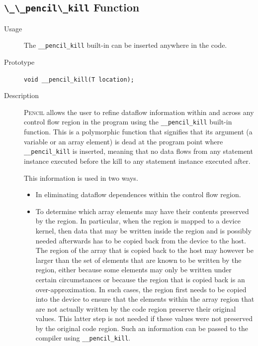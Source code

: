 \documentclass{carp}
\newcommand\pencil{\textsc{Pencil}\xspace}
\begin{document}
\subsection{\lstinline!\_\_pencil\_kill! Function}
\begin{description}
\item [Usage] The \lstinline!__pencil_kill! built-in can be
  inserted anywhere in the code.
\item [Prototype] \lstinline!void __pencil_kill(T location);!
\item [Description]  \pencil allows the user to refine dataflow information
  within and across any control flow region in the program using the
  \lstinline!__pencil_kill! built-in function.
  This is a polymorphic function that signifies that its argument
  (a variable or an array element) is dead at the program point
  where \lstinline!__pencil_kill! is inserted, meaning that no data
  flows from any statement instance executed before the kill to any
  statement instance executed after.

  This information is used in two ways.
  \begin{itemize}
   \item In eliminating dataflow dependences within the control
         flow region.
   \item To determine which array elements may have their contents
         preserved by the region.
         In particular, when the region is mapped to a device kernel, then
         data that may be written inside the region and is possibly needed
         afterwards has to be copied back from the device to the host.
         The region of the array that is copied back to the host may
         however be larger than the set of elements that are known
         to be written by the region, either because some elements
         may only be written under certain circumstances or because
         the region that is copied back is an over-approximation.
         In such cases, the region first needs to be copied into the device
         to ensure that the elements within the array region that are not
         actually written by the code region preserve their original values.
         This latter step is not needed if these values were not preserved
         by the original code region.  Such an information can be passed to
         the compiler using \lstinline!__pencil_kill!.
  \end{itemize}


\end{description}
\end{document}

